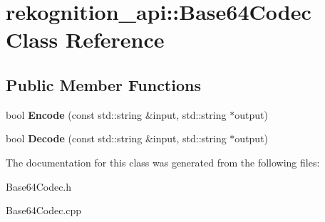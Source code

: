 \hypertarget{classrekognition__api_1_1Base64Codec}{\section{rekognition\-\_\-api\-:\-:\-Base64\-Codec \-Class \-Reference}
\label{classrekognition__api_1_1Base64Codec}
}
\subsection*{\-Public \-Member \-Functions}
\begin{DoxyCompactItemize}
\item 
\hypertarget{classrekognition__api_1_1Base64Codec_ae431dc46f81b4b36a53a0567a4601a0d}{bool {\bfseries \-Encode} (const std\-::string \&input, std\-::string $\ast$output)}\label{classrekognition__api_1_1Base64Codec_ae431dc46f81b4b36a53a0567a4601a0d}

\item 
\hypertarget{classrekognition__api_1_1Base64Codec_a8238e16a21f19e877ea4d9dc6d909962}{bool {\bfseries \-Decode} (const std\-::string \&input, std\-::string $\ast$output)}\label{classrekognition__api_1_1Base64Codec_a8238e16a21f19e877ea4d9dc6d909962}

\end{DoxyCompactItemize}


\-The documentation for this class was generated from the following files\-:\begin{DoxyCompactItemize}
\item 
\-Base64\-Codec.\-h\item 
\-Base64\-Codec.\-cpp\end{DoxyCompactItemize}
